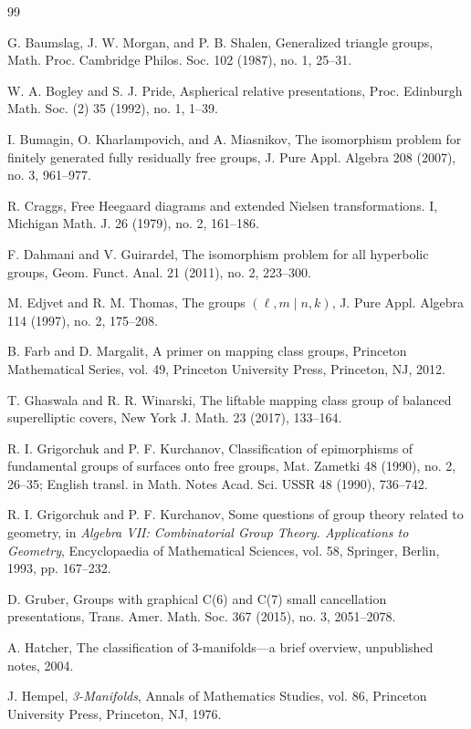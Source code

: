 \documentclass{article}
\begin{document}
\begin{thebibliography}{99}

G. Baumslag, J. W. Morgan, and P. B. Shalen,
Generalized triangle groups,
Math. Proc. Cambridge Philos. Soc. 102 (1987), no. 1, 25--31.

W. A. Bogley and S. J. Pride,
Aspherical relative presentations,
Proc. Edinburgh Math. Soc. (2) 35 (1992), no. 1, 1--39.

I. Bumagin, O. Kharlampovich, and A. Miasnikov,
The isomorphism problem for finitely generated fully residually free groups,
J. Pure Appl. Algebra 208 (2007), no. 3, 961--977.

R. Craggs,
Free Heegaard diagrams and extended Nielsen transformations. I,
Michigan Math. J. 26 (1979), no. 2, 161--186.

F. Dahmani and V. Guirardel,
The isomorphism problem for all hyperbolic groups,
Geom. Funct. Anal. 21 (2011), no. 2, 223--300.

M. Edjvet and R. M. Thomas,
The groups $(\ell,m\mid n,k)$,
J. Pure Appl. Algebra 114 (1997), no. 2, 175--208.

B. Farb and D. Margalit,
A primer on mapping class groups,
Princeton Mathematical Series, vol. 49,
Princeton University Press, Princeton, NJ, 2012.

T. Ghaswala and R. R. Winarski,
The liftable mapping class group of balanced superelliptic covers,
New York J. Math. 23 (2017), 133--164.

R. I. Grigorchuk and P. F. Kurchanov,
Classification of epimorphisms of fundamental groups of surfaces onto free groups,
Mat. Zametki 48 (1990), no. 2, 26--35;
English transl. in Math. Notes Acad. Sci. USSR 48 (1990), 736--742.

R. I. Grigorchuk and P. F. Kurchanov,
Some questions of group theory related to geometry,
in \textit{Algebra VII: Combinatorial Group Theory. Applications to Geometry},
Encyclopaedia of Mathematical Sciences, vol. 58,
Springer, Berlin, 1993, pp. 167--232.

D. Gruber,
Groups with graphical C(6) and C(7) small cancellation presentations,
Trans. Amer. Math. Soc. 367 (2015), no. 3, 2051--2078.

A. Hatcher,
The classification of 3-manifolds---a brief overview,
unpublished notes, 2004.

J. Hempel,
\textit{3-Manifolds},
Annals of Mathematics Studies, vol. 86,
Princeton University Press, Princeton, NJ, 1976.


\end{thebibliography}
\end{document}
